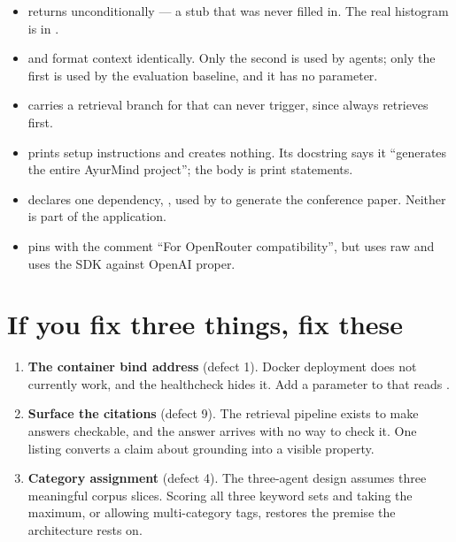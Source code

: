 \begin{itemize}[leftmargin=*]
  \item {} returns  unconditionally --- a stub that was never filled in. The real histogram is in .
  \item {} and  format context identically. Only the second is used by agents; only the first is used by the evaluation baseline, and it has no  parameter.
  \item {} carries a retrieval branch for  that  can never trigger, since  always retrieves first.
  \item {} prints setup instructions and creates nothing. Its docstring says it ``generates the entire AyurMind project''; the body is print statements.
  \item {} declares one dependency, , used by  to generate the conference paper. Neither is part of the application.
  \item {} pins  with the comment ``For OpenRouter compatibility'', but  uses raw  and  uses the SDK against OpenAI proper.
\end{itemize}

\section{If you fix three things, fix these}

\begin{enumerate}[leftmargin=*]
  \item \textbf{The container bind address} (defect 1). Docker deployment does not currently work, and the healthcheck hides it. Add a  parameter to  that reads .
  \item \textbf{Surface the citations} (defect 9). The retrieval pipeline exists to make answers checkable, and the answer arrives with no way to check it. One  listing  converts a claim about grounding into a visible property.
  \item \textbf{Category assignment} (defect 4). The three-agent design assumes three meaningful corpus slices. Scoring all three keyword sets and taking the maximum, or allowing multi-category tags, restores the premise the architecture rests on.
\end{enumerate}

